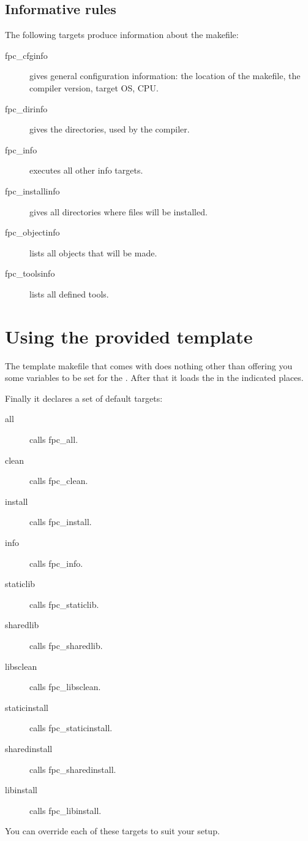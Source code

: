\documentclass{report}
\begin{document}
\subsection{Informative rules}

The following targets produce information about the makefile:
\begin{description}
\item[fpc\_cfginfo] gives general configuration information: the location of
the makefile, the compiler version, target OS, CPU.
\item[fpc\_dirinfo] gives the directories, used by the compiler.
\item[fpc\_info] executes all other info targets.
\item[fpc\_installinfo] gives all directories where files will be installed.
\item[fpc\_objectinfo] lists all objects that will be made.
\item[fpc\_toolsinfo] lists all defined tools.
\end{description}

\section{Using the provided template}

The template makefile that comes with \fpc does nothing other than 
offering you some variables to be set for the . 
After that it loads the  in the indicated places.

Finally it declares a set of default targets:
\begin{description}
\item[all]  calls fpc\_all.
\item[clean]  calls fpc\_clean.
\item[install]  calls fpc\_install.
\item[info]  calls fpc\_info.
\item[staticlib]  calls fpc\_staticlib.
\item[sharedlib]  calls fpc\_sharedlib.
\item[libsclean]  calls fpc\_libsclean.
\item[staticinstall]  calls fpc\_staticinstall.
\item[sharedinstall]  calls fpc\_sharedinstall.
\item[libinstall]  calls fpc\_libinstall.
\end{description}

You can override each of these targets to suit your setup.
\end{document}
